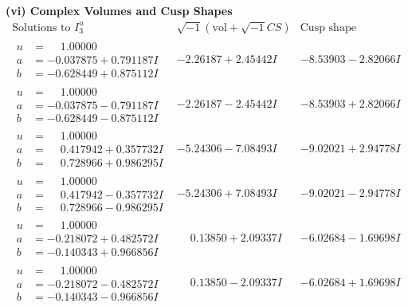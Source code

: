 \documentclass[1p]{elsarticle_modified}
\theoremstyle{definition}
\newcommand{\I}{\sqrt{-1}}
\begin{document}
\newpage\flushleft \textbf{(vi) Complex Volumes and Cusp Shapes}
$$\begin{array}{c|c|c}  
\text{Solutions to }I^u_{3}& \I (\text{vol} + \sqrt{-1}CS) & \text{Cusp shape}\\
 \hline 
\begin{aligned}
u &= \phantom{-}1.00000\phantom{ +0.000000I} \\
a &= -0.037875 + 0.791187 I \\
b &= -0.628449 + 0.875112 I\end{aligned}
 & -2.26187 + 2.45442 I & -8.53903 - 2.82066 I \\ \hline\begin{aligned}
u &= \phantom{-}1.00000\phantom{ +0.000000I} \\
a &= -0.037875 - 0.791187 I \\
b &= -0.628449 - 0.875112 I\end{aligned}
 & -2.26187 - 2.45442 I & -8.53903 + 2.82066 I \\ \hline\begin{aligned}
u &= \phantom{-}1.00000\phantom{ +0.000000I} \\
a &= \phantom{-}0.417942 + 0.357732 I \\
b &= \phantom{-}0.728966 + 0.986295 I\end{aligned}
 & -5.24306 - 7.08493 I & -9.02021 + 2.94778 I \\ \hline\begin{aligned}
u &= \phantom{-}1.00000\phantom{ +0.000000I} \\
a &= \phantom{-}0.417942 - 0.357732 I \\
b &= \phantom{-}0.728966 - 0.986295 I\end{aligned}
 & -5.24306 + 7.08493 I & -9.02021 - 2.94778 I \\ \hline\begin{aligned}
u &= \phantom{-}1.00000\phantom{ +0.000000I} \\
a &= -0.218072 + 0.482572 I \\
b &= -0.140343 + 0.966856 I\end{aligned}
 & \phantom{-}0.13850 + 2.09337 I & -6.02684 - 1.69698 I \\ \hline\begin{aligned}
u &= \phantom{-}1.00000\phantom{ +0.000000I} \\
a &= -0.218072 - 0.482572 I \\
b &= -0.140343 - 0.966856 I\end{aligned}
 & \phantom{-}0.13850 - 2.09337 I & -6.02684 + 1.69698 I \\ \hline\begin{aligned}

\end{aligned}
\end{array}$$
\end{document}
